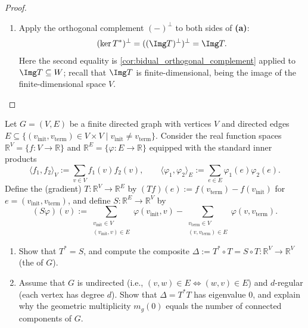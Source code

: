 \begin{proof}
\begin{enumerate}[label=\textbf{(\alph*)}]
    \item Apply the orthogonal complement $(-)^\perp$ to both sides of \textbf{(a)}:
    \[
        (\ker T^*)^\perp = ((\Img T)^\perp)^\perp = \Img T.
    \]
    Here the second equality is \cref{cor:bidual_orthogonal_complement} applied to $\Img T \subseteq W$; recall that $\Img T$ is finite-di\-men\-sional, being the image of the finite-di\-men\-sional space $V$.
\end{enumerate}
\end{proof}

\begin{exercise}
  \label{exc:graph_laplacian_adjoint}
  Let $G = (V, E)$ be a finite directed graph with vertices $V$ and directed edges $E \subseteq \{(v_{\text{init}}, v_{\text{term}}) \in V \times V \mid v_{\text{init}} \neq v_{\text{term}}\}$. Consider the real function spaces $\mathbb{R}^V = \{f \colon V \to \mathbb{R}\}$ and $\mathbb{R}^E = \{\varphi \colon E \to \mathbb{R}\}$ equipped with the standard inner products
  \[
  \langle f_1, f_2 \rangle_V := \sum_{v \in V} f_1(v) f_2(v), \qquad \langle \varphi_1, \varphi_2 \rangle_E := \sum_{e \in E} \varphi_1(e) \varphi_2(e).
  \]
  Define the  (gradient) $T \colon \mathbb{R}^V \to \mathbb{R}^E$ by $(Tf)(e) := f(v_{\text{term}}) - f(v_{\text{init}})$ for $e = (v_{\text{init}}, v_{\text{term}})$, and define $S \colon \mathbb{R}^E \to \mathbb{R}^V$ by
  \[
  (S\varphi)(v) := \sum_{\substack{v_{\text{init}} \in V \\ (v_{\text{init}}, v) \in E}} \varphi(v_{\text{init}}, v) - \sum_{\substack{v_{\text{term}} \in V \\ (v, v_{\text{term}}) \in E}} \varphi(v, v_{\text{term}}).
  \]
  \begin{enumerate}[label=\textbf{(\alph*)}]
    \item Show that $T^* = S$, and compute the composite $\Delta := T^* \circ T = S \circ T \colon \mathbb{R}^V \to \mathbb{R}^V$ (the  of $G$).
    \item Assume that $G$ is undirected (i.e., $(v, w) \in E \iff (w, v) \in E$) and $d$-regular (each vertex has degree $d$). Show that $\Delta = T^* T$ has eigenvalue $0$, and explain why the geometric multiplicity $m_g(0)$ equals the number of connected components of $G$.
  \end{enumerate}
\end{exercise}
